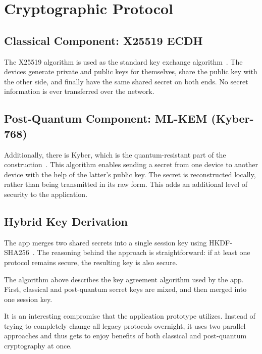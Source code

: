\section{Cryptographic Protocol}

\subsection{Classical Component: X25519 ECDH}
The X25519 algorithm is used as the standard key exchange algorithm~\cite{rfc7748}. The devices generate private and public keys for themselves, share the public key with the other side, and finally have the same shared secret on both ends. No secret information is ever transferred over the network.

\subsection{Post-Quantum Component: ML-KEM (Kyber-768)}
Additionally, there is Kyber, which is the quantum-resistant part of the construction~\cite{fips203}. This algorithm enables sending a secret from one device to another device with the help of the latter's public key. The secret is reconstructed locally, rather than being transmitted in its raw form. This adds an additional level of security to the application.

\subsection{Hybrid Key Derivation}
The app merges two shared secrets into a single session key using HKDF-SHA256~\cite{pqxdh}. The reasoning behind the approach is straightforward: if at least one protocol remains secure, the resulting key is also secure.


The algorithm above describes the key agreement algorithm used by the app. First, classical and post-quantum secret keys are mixed, and then merged into one session key.

It is an interesting compromise that the application prototype utilizes. Instead of trying to completely change all legacy protocols overnight, it uses two parallel approaches and thus gets to enjoy benefits of both classical and post-quantum cryptography at once.

